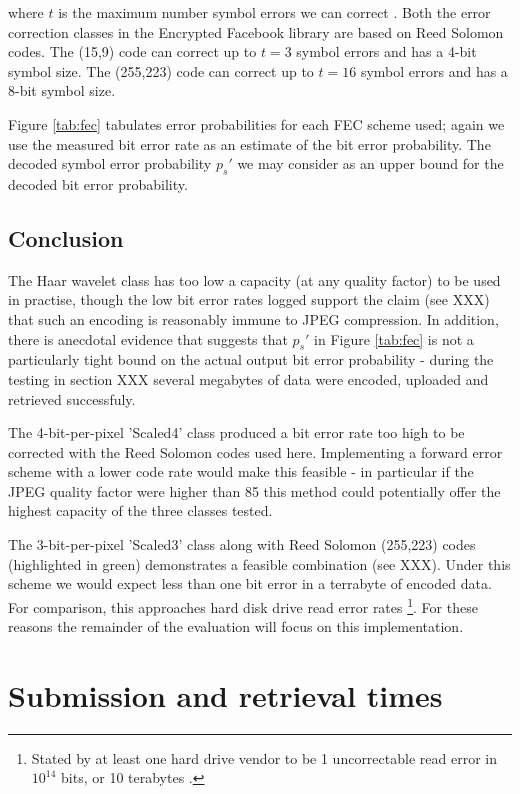 where $t$ is the maximum number symbol errors we can correct \cite{rsfec-decode}. Both the error correction classes in the Encrypted Facebook library are based on Reed Solomon codes. The (15,9) code can correct up to $t=3$ symbol errors and has a 4-bit symbol size. The (255,223) code can correct up to $t=16$ symbol errors and has a 8-bit symbol size.

Figure \ref{tab:fec} tabulates error probabilities for each FEC scheme used; again we use the
measured bit error rate as an estimate of the bit error probability. The decoded symbol error probability $p_s'$ we may consider as an upper bound for the decoded bit error probability. 



\subsection{Conclusion}
\label{ssec:image-conc}

The Haar wavelet class has too low a capacity (at any quality factor) to be used in practise, though the low bit error rates logged support the claim (see XXX) that such an encoding is reasonably immune to JPEG compression. In addition, there is anecdotal evidence that suggests that $p_s'$ in Figure \ref{tab:fec} is not a particularly tight bound on the actual output bit error probability - during the testing in section XXX several megabytes of data were encoded, uploaded and retrieved successfuly. 

The 4-bit-per-pixel 'Scaled4' class produced a bit error rate too high to be corrected with the Reed Solomon codes used here. Implementing a forward error scheme with a lower code rate would make this feasible - in particular if the JPEG quality factor were higher than 85 this method could potentially offer the highest capacity of the three classes tested.

The 3-bit-per-pixel 'Scaled3' class along with Reed Solomon (255,223) codes (highlighted in green) demonstrates a feasible combination (see XXX). Under this scheme we would expect less than one bit error in a terrabyte of encoded data. For comparison, this approaches hard disk drive read error rates \footnote{Stated by at least one hard drive vendor to be 1 uncorrectable read error in $10^{14}$ bits, or 10 terabytes \cite{hdd-errors}.}. For these reasons the remainder of the evaluation will focus on this implementation.



\section{Submission and retrieval times}

